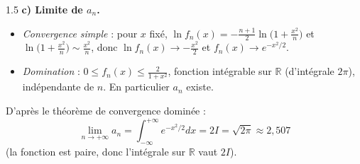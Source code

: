 \documentclass[12pt]{article}
\begin{document}
\begin{spacing}{1.5}
\textbf{c) Limite de $a_n$.}
\begin{itemize}
\item \emph{Convergence simple} : pour $x$ fixé, $\ln f_n(x)=-\frac{n+1}{2}\ln\big(1+\frac{x^2}{n}\big)$ et $\ln\big(1+\frac{x^2}{n}\big)\sim\frac{x^2}{n}$, donc $\ln f_n(x)\to-\frac{x^2}{2}$ et $f_n(x)\to e^{-x^2/2}$.
\item \emph{Domination} : $0\le f_n(x)\le\frac{2}{1+x^2}$, fonction intégrable sur $\mathbb{R}$ (d'intégrale $2\pi$), indépendante de $n$. En particulier $a_n$ existe.
\end{itemize}
D'après le théorème de convergence dominée :
\[
\lim_{n\to+\infty}a_n=\int_{-\infty}^{+\infty}e^{-x^2/2}dx=2I=\boxed{\sqrt{2\pi}\approx2{,}507}
\]
(la fonction est paire, donc l'intégrale sur $\mathbb{R}$ vaut $2I$).

\end{spacing}
\end{document}
